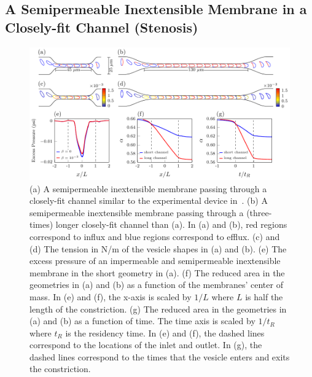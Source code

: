 \documentclass[prb,preprint,showpacs,preprintnumbers,amsmath,amssymb,longbibliography]{revtex4-1}
\newif\ifTikz
\begin{document}
\subsection{A Semipermeable Inextensible Membrane in a Closely-fit
Channel (Stenosis)}
\begin{figure}[htp]
  \centering
  \ifTikz
  
  \else
  \includegraphics{figures/stenosisComposite.pdf}
  \fi
  \caption{\label{fig:stenosisComposite} (a) A semipermeable
  inextensible membrane passing through a closely-fit channel similar to
  the experimental device in~\citet{abk-fai-sto2006}. (b) A
  semipermeable inextensible membrane passing through a (three-times)
  longer closely-fit channel than (a). In (a) and (b), red regions
  correspond to influx and blue regions correspond to efflux. (c) and
  (d) The tension in N/m of the vesicle shapes in (a) and (b). (e) The
  excess pressure of an impermeable and semipermeable inextensible
  membrane in the short geometry in (a). (f) The reduced area in the
  geometries in (a) and (b) as a function of the membranes' center of
  mass. In (e) and (f), the x-axis is scaled by $1/L$ where $L$ is half
  the length of the constriction. (g) The reduced area in the geometries
  in (a) and (b) as a function of time. The time axis is scaled by
  $1/t_R$ where $t_R$ is the residency time. In (e) and (f), the dashed
  lines correspond to the locations of the inlet and outlet. In (g), the
  dashed lines correspond to the times that the vesicle enters and exits
  the constriction.}
\end{figure}
\end{document}
